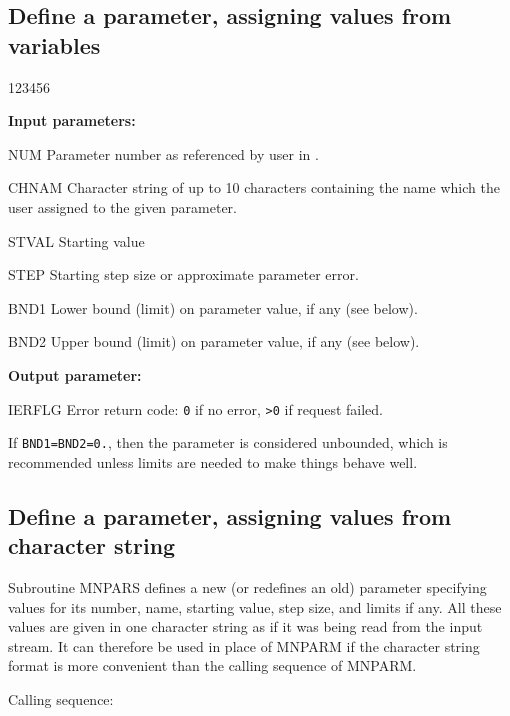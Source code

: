 \subsection{Define a parameter, assigning values from variables}
 
 
\begin{DLtt}{123456}
\item[{\rm\bf Input parameters:}]
\item[NUM]    Parameter number as referenced by user in .
\item[CHNAM]  Character string of up to 10 characters containing
              the name which the user assigned to the given parameter.
\item[STVAL]  Starting value
\item[STEP]   Starting step size or approximate parameter error.
\item[BND1]   Lower bound (limit) on parameter value, if any (see below).
\item[BND2]   Upper bound (limit) on parameter value, if any (see below).
\item[{\rm\bf Output parameter:}]
\item[IERFLG] Error return code: \texttt{0} if no error, \texttt{>0} if request failed.
\end{DLtt}
 
If \texttt{BND1=BND2=0.}, then the parameter is considered unbounded, which
is recommended unless limits are needed to make things behave well.

\subsection{Define a parameter, assigning values from character string}
       Subroutine MNPARS defines a new (or redefines an old) parameter
specifying values for its number, name, starting value, step size, and
limits if any.  All these values are given in one character string as
if it was being read from the input stream.  It can therefore be used
in place of MNPARM if the character string format is more convenient
than the calling sequence of MNPARM.

Calling sequence:



